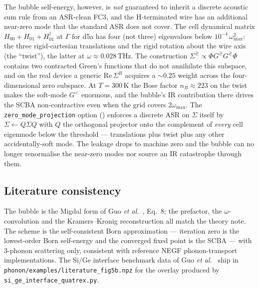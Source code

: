 The bubble self-energy, however, is \emph{not} guaranteed to inherit a
discrete acoustic sum rule from an ASR-clean FC3, and the
H-terminated wire has an additional near-zero mode that the standard
ASR does not cover. The cell dynamical matrix
$H_{00}+H_{01}+H_{01}^{\dagger}$ at $\Gamma$ for d5a has four (not
three) eigenvalues below $10^{-4}\,\omega_{\max}^{2}$: the three
rigid-cartesian translations and the rigid rotation about the wire
axis (the ``twist''), the latter at
$\omega\approx 0.028$\,THz. The construction
$\Sigma^{\gtrless}\propto\Phi G^{\gtrless}G^{\gtrless}\Phi$ contains
two contracted Green's functions that do not annihilate this subspace,
and on the real device a generic $\mathrm{Re}\,\Sigma^{R}$ acquires a
$\sim 0.25$ weight across the four-dimensional zero subspace. At
$T=300$\,K the Bose factor $n_{B}\approx 223$ on the twist makes the
soft-mode $G^{<}$ enormous, and the bubble's IR contribution there
drives the SCBA non-contractive even when the grid covers
$2\omega_{\max}$. The \texttt{zero\_mode\_projection} option
() enforces a discrete ASR on $\Sigma$
itself by $\Sigma\leftarrow Q\Sigma Q$ with $Q$ the orthogonal
projector onto the complement of \emph{every} cell eigenmode below the
threshold --- translations plus twist plus any other accidentally-soft
mode. The leakage drops to machine zero and the bubble can no longer
renormalise the near-zero modes nor source an IR catastrophe through
them.

\subsection{Literature consistency}

The bubble is the Migdal form of Guo \emph{et al.}~\cite{guo_quantum_2020}, Eq.~8; the prefactor, the
$\omega$-convolution and
the Kramers--Kronig reconstruction all match the theory note. The
scheme is the self-consistent Born approximation --- iteration zero is
the lowest-order Born self-energy and the converged fixed point is the
SCBA --- with 3-phonon scattering only, consistent with reference NEGF
phonon-transport implementations. The Si/Ge interface benchmark data
of Guo \emph{et al.}~\cite{guo_quantum_2020} ship in
\texttt{phonon/examples/literature\_fig5b.npz} for the overlay
produced by \texttt{si\_ge\_interface\_quatrex.py}.
